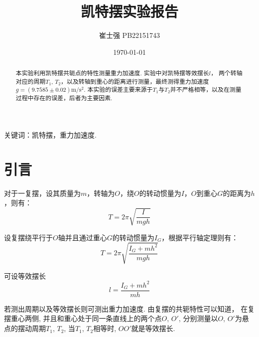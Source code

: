 \documentclass[UTF8]{ctexart}
\title{凯特摆实验报告}
\author{崔士强 PB22151743}
\date{\today}
\begin{document}
\maketitle
\begin{abstract}
  本实验利用凯特摆共轭点的特性测量重力加速度. 实验中对凯特摆等效摆长$l$，
  两个转轴对应的周期$T_1$, $T_2$，以及转轴到重心的距离进行测量，最终测得重力加速度$g=\left(9.7585 \pm 0.02\right)\mathrm{m/s^2}$.
  本实验的误差主要来源于$T_1$与$T_2$并不严格相等，以及在测量过程中存在的误差，后者为主要因素.
\end{abstract}

关键词：凯特摆，重力加速度.

\section{引言}
对于一复摆，设其质量为$m$，转轴为$O$，绕$O$的转动惯量为$I$，$O$到重心$G$的距离为$h$，则有：
\[T = 2\pi \sqrt{\frac{I}{mgh}}\]

设复摆绕平行于$O$轴并且通过重心$G$的转动惯量为$I_G$，根据平行轴定理则有：
\[T = 2\pi \sqrt{\frac{I_G+mh^2}{mgh}}\]

可设等效摆长
\[l = \frac{I_G+mh^2}{mh}\]

若测出周期以及等效摆长则可测出重力加速度. 由复摆的共轭特性可以知道，
在复摆重心两侧, 并且和重心处于同一条直线上的两个点$O$, $O'$,
分别测量以$O$, $O'$为悬点的摆动周期$T_1$, $T_2$, 当$T_1$, $T_2$相等时, $OO'$就是等效摆长.
\end{document}
